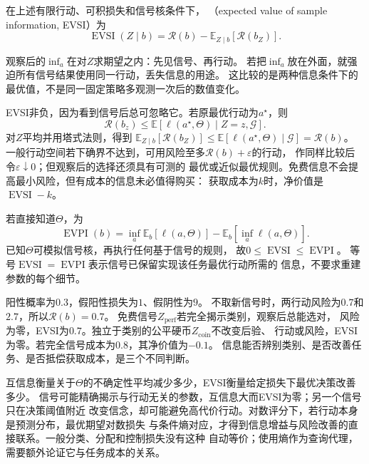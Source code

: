 \begin{definition}[期望样本信息价值]
\label{def:decision-expected-sample-information-value}
在上述有限行动、可积损失和信号核条件下，
（expected value of sample information, EVSI）为
\begin{equation}
  \operatorname{EVSI}(Z\mid b)
  =\mathcal R(b)-\mathbb E_{Z\mid b}[\mathcal R(b_Z)].
  \label{eq:decision-evsi}
\end{equation}
\end{definition}
观察后的$\inf_a$在对$Z$求期望之内：先见信号、再行动。
若把$\inf_a$放在外面，就强迫所有信号结果使用同一行动，丢失信息的用途。
这比较的是两种信息条件下的最优值，不是同一固定策略多观测一次后的数值变化。

EVSI非负，因为看到信号后总可忽略它。若原最优行动为$a^\star$，则
\[
  \mathcal R(b_z)\leq
  \mathbb E[\ell(a^\star,\Theta)\mid Z=z,\mathcal G].
\]
对$Z$平均并用塔式法则，得到
$\mathbb E_{Z\mid b}[\mathcal R(b_Z)]\leq
\mathbb E[\ell(a^\star,\Theta)\mid\mathcal G]=\mathcal R(b)$。
一般行动空间若下确界不达到，可用风险至多$\mathcal R(b)+\varepsilon$的行动，
作同样比较后令$\varepsilon\downarrow0$；但观察后的选择还须具有可测的
最优或近似最优规则。免费信息不会提高最小风险，但有成本的信息未必值得购买：
获取成本为$k$时，净价值是$\operatorname{EVSI}-k$。

若直接知道$\Theta$，为
\begin{equation}
  \operatorname{EVPI}(b)
  =\inf_a\mathbb E_b[\ell(a,\Theta)]
    -\mathbb E_b[\inf_a\ell(a,\Theta)].
  \label{eq:decision-evpi}
\end{equation}
已知$\Theta$可模拟信号核，再执行任何基于信号的规则，
故$0\leq\operatorname{EVSI}\leq\operatorname{EVPI}$。
等号$\operatorname{EVSI}=\operatorname{EVPI}$表示信号已保留实现该任务最优行动所需的
信息，不要求重建参数的每个细节。

\begin{example}[辨别信号与无关信号]
\label{ex:decision-informative-and-irrelevant-signals}
阳性概率为$0.3$，假阳性损失为$1$、假阴性为$9$。
不取新信号时，两行动风险为$0.7$和$2.7$，所以$\mathcal R(b)=0.7$。
免费信号$Z_{\mathrm{perf}}$若完全揭示类别，观察后总能选对，
风险为零，EVSI为$0.7$。独立于类别的公平硬币$Z_{\mathrm{coin}}$不改变后验、
行动或风险，EVSI为零。若完全信号成本为$0.8$，其净价值为$-0.1$。
信息能否辨别类别、是否改善任务、是否抵偿获取成本，是三个不同判断。
\end{example}

互信息衡量关于$\Theta$的不确定性平均减少多少，EVSI衡量给定损失下最优决策改善多少。
信号可能精确揭示与行动无关的参数，互信息大而EVSI为零；另一个信号只在决策阈值附近
改变信念，却可能避免高代价行动。对数评分下，若行动本身是预测分布，最优期望对数损失
与条件熵对应，才得到信息增益与风险改善的直接联系。一般分类、分配和控制损失没有这种
自动等价；使用熵作为查询代理，需要额外论证它与任务成本的关系。

